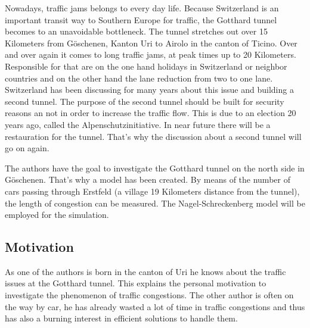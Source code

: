 Nowadays, traffic jams belongs to every day life. Because Switzerland is an important transit way to Southern Europe for traffic, the Gotthard tunnel becomes to an unavoidable bottleneck. The tunnel stretches out over 15 Kilometers from Göschenen, Kanton Uri to Airolo in the canton of Ticino. Over and over again it comes to long traffic jams, at peak times up to 20 Kilometers. Responsible for that are  on the one hand holidays in Switzerland or neighbor countries and on the other hand the lane reduction from two to one lane. Switzerland has been discussing for many years about this issue and building a second tunnel. The purpose of the second tunnel should be built for security reasons an not in order to increase the traffic flow. This is due to an election 20 years ago, called the Alpenschutzinitiative. 
In near future there will be a restauration for the tunnel. That's why the discussion about a second tunnel will go on again.

The authors have the goal to investigate the Gotthard tunnel on the north side in Göschenen. That's why a model has been created. By means of the number of cars passing through Erstfeld (a village 19 Kilometers distance from the tunnel), the length of congestion can be measured. The Nagel-Schreckenberg model will be employed for the simulation.


\subsection{Motivation}
As one of the authors is born in the canton of Uri he knows about the traffic issues at the Gotthard tunnel. This explains the personal motivation to investigate the phenomenon of traffic congestions. The other author is often on the way by car, he has already wasted a lot of time in traffic congestions
and thus has also a burning interest in efficient solutions to handle them.















